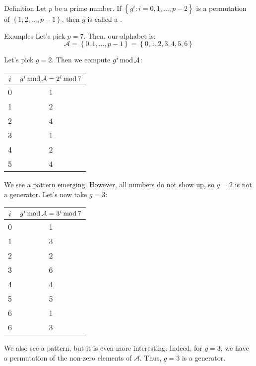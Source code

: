 \documentclass[a4paper]{article}
\begin{document}
\begin{parag}{Definition}
    Let $p$ be a prime number. If $\left\{g^i : i = 0, 1, \ldots, p-2\right\}$ is a permutation of $\left\{1, 2, \ldots, p-1\right\}$, then $g$ is called a .

    \begin{subparag}{Examples}
        Let's pick $p = 7$. Then, our alphabet is:
        \[\mathcal{A} = \left\{0, 1, \ldots, p-1\right\} = \left\{0, 1, 2, 3, 4, 5, 6\right\}\]

        Let's pick $g = 2$. Then we compute $g^i \operatorname{mod} \mathcal{A}$:
        \begin{center}
        \begin{tabular}{c|c}
            $i$ & $g^i \operatorname{mod} \mathcal{A} = 2^i \operatorname{mod} 7$ \\
            \hline
            0 & 1 \\
            1 & 2 \\
            2 & 4 \\
            3 & 1 \\
            4 & 2 \\
            5 & 4 \\
        \end{tabular}
        \end{center}

        We see a pattern emerging. However, all numbers do not show up, so $g = 2$ is not a generator. Let's now take $g = 3$:
        \begin{center}
        \begin{tabular}{c|c}
            $i$ & $g^i \operatorname{mod} \mathcal{A} = 3^i \operatorname{mod} 7$ \\
            \hline
            0 & 1 \\
            1 & 3 \\
            2 & 2 \\
            3 & 6 \\
            4 & 4 \\
            5 & 5 \\
            6 & 1 \\
            6 & 3
        \end{tabular}
        \end{center}

        We also see a pattern, but it is even more interesting. Indeed, for $g = 3$, we have a permutation of the non-zero elements of $\mathcal{A}$. Thus, $g = 3$ is a generator.
    \end{subparag}

\end{parag}
\end{document}
